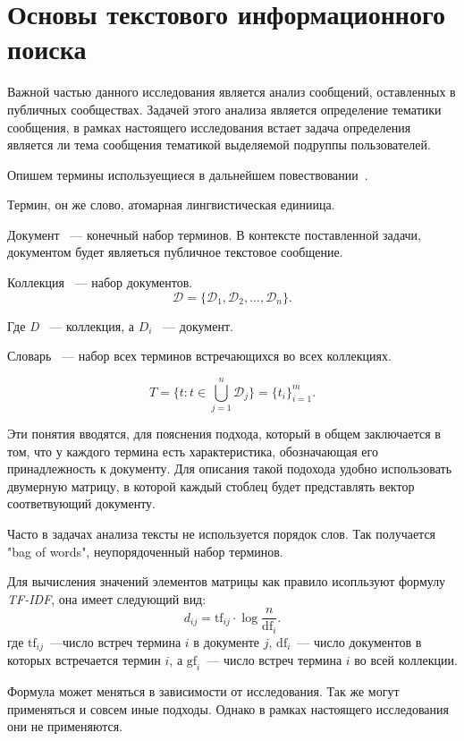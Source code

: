 \documentclass[annotation,times,page4]{itmo-student-thesis}
\begin{document}
\section{Основы текстового информационного поиска}
Важной частью данного исследования является анализ сообщений, оставленных в публичных сообществах. Задачей этого анализа является определение тематики сообщения, в рамках настоящего исследования встает задача определения является ли тема сообщения тематикой выделяемой подруппы пользователей.

Опишем термины используещиеся в дальнейшем повествовании~\cite{manning2008introduction}.  

Термин, он же слово, атомарная лингвистическая единиица.

Документ ~--- конечный набор терминов. В контексте поставленной задачи, документом будет являеться публичное текстовое сообщение.

Коллекция ~--- набор документов.
\[
    \mathcal{D} = \{\mathcal{D}_1, \mathcal{D}_2,...,\mathcal{D}_n\}.
\]
 
Где \textit{D} ~--- коллекция, а $D_{i}$ ~--- документ.

Словарь ~--- набор всех терминов встречающихся во всех коллекциях.

\[
    T = \{t \colon t \in \bigcup_{j=1}^{n} \mathcal{D}_j\} = \{t_i\}_{i=1}^{m}.
\]

Эти понятия вводятся, для пояснения подхода, который в общем заключается в том, что у каждого термина есть характеристика, обозначающая его принадлежность к документу. Для описания такой подохода удобно использовать двумерную матрицу, в которой каждый стоблец будет представлять вектор соответвующий документу.

Часто в задачах анализа тексты не используется порядок слов. Так получается "bag of words", неупорядоченный набор терминов.

Для вычисления значений элементов матрицы как правило исопльзуют формулу \textit{ TF-IDF}, она имеет следующий вид: 
\begin{equation}\label{eq:tf_idf}
    d_{ij} = \mathrm{tf}_{ij} \cdot \log{\frac{n}{\mathrm{df}_{i}}}.
\end{equation} 
где $\mathrm{tf}_{ij}$~---число встреч термина $i$ в документе $j$, $\mathrm{df}_{i}$~---
число документов в которых встречается термин $i$, а $\mathrm{gf}_{i}$~---
число встреч термина $i$ во всей коллекции.

Формула может меняться в зависимости от исследования. Так же могут применяться и совсем иные подходы. Однако в рамках настоящего исследования они не применяются.
\end{document}
